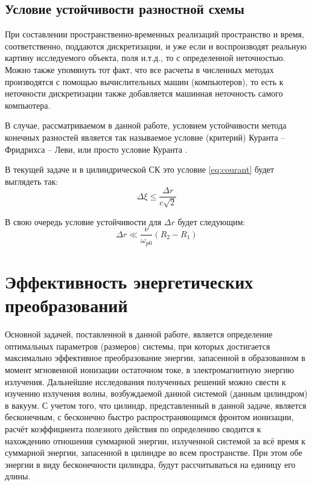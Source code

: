 \documentclass[a4paper]{article}
\begin{document}
\subsection{Условие устойчивости разностной схемы}

При составлении пространственно-временных реализаций пространство и время, соответственно, поддаются дискретизации, и уже если и воспроизводят реальную картину исследуемого объекта, поля и.т.д., то с определенной неточностью. Можно также упомянуть тот факт, что все расчеты в численных методах производятся с помощью вычислительных машин (компьютеров), то есть к неточности дискретизации также добавляется машинная неточность самого компьютера.

В случае, рассматриваемом в данной работе, условием устойчивости метода конечных разностей является так называемое условие (критерий) Куранта -- Фридрихса -- Леви, или просто условие Куранта \cite{courant1945}.

В текущей задаче и в цилиндрической СК это условие \eqref{eq:courant} будет выглядеть так:
\begin{equation}
	\Delta\xi\leq\frac{\Delta r}{c\sqrt{2}}
	\label{eq:courant}
\end{equation}

В свою очередь условие устойчивости для $\Delta r$ будет следующим:
\begin{equation}
	\Delta r\ll\dfrac{\nu}{\omega_{p 0}}\left(R_{2}-R_{1}\right)
	\label{eq:courant_1}
\end{equation}








\newpage
\section{Эффективность энергетических преобразований}

Основной задачей, поставленной в данной работе, является определение оптимальных параметров (размеров) системы, при которых достигается максимально эффективное преобразование энергии, запасенной в образованном в момент мгновенной ионизации остаточном токе, в электромагнитную энергию излучения. Дальнейшие исследования полученных решений можно свести к изучению излучения волны, возбуждаемой данной системой (данным цилиндром) в вакуум. С учетом того, что цилиндр, представленный в данной задаче, является бесконечным, с бесконечно быстро распространяющимся фронтом ионизации, расчёт коэффициента полезного действия по определению сводится к нахождению отношения суммарной энергии, излученной системой за всё время к суммарной энергии, запасенной в цилиндре во всем пространстве. При этом обе энергии в виду бесконечности цилиндра, будут рассчитываться на единицу его длины. 
\end{document}
